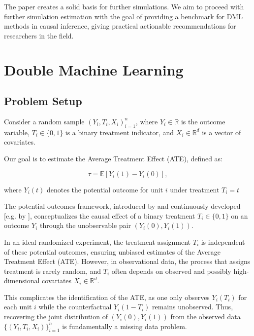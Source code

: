 \documentclass{article}
\numberwithin{equation}{section}
\begin{document}
The paper creates a solid basis for further simulations. We aim to proceed with further simulation estimation with the goal of providing a benchmark for DML methods in causal inference, giving practical actionable recommendations for researchers in the field.

\newpage
\tableofcontents
\newpage

\section{Double Machine Learning}

\subsection{Problem Setup}

Consider a random sample ${(Y_i, T_i, X_i)}_{i=1}^n$, where $Y_i \in \mathbb{R}$ is the outcome variable, $T_i \in \{0,1\}$ is a binary treatment indicator, and $X_i \in \mathbb{R}^d$ is a vector of covariates.

Our goal is to estimate the Average Treatment Effect (ATE), defined as:

\begin{equation}
\tau = \mathbb{E}[Y_i(1) - Y_i(0)],
\label{eq:tau_hat_potential_outcome}
\end{equation}

where $Y_i(t)$ denotes the potential outcome for unit $i$ under treatment $T_i = t$

The potential outcomes framework, introduced by \cite{Rubin1974} and continuously developed [e.g. by \cite{ImbensRubin2015}], conceptualizes the causal effect of a binary treatment \(T_i \in \{0,1\}\) on an outcome \(Y_i\) through the unobservable pair \((Y_i(0), Y_i(1))\).

In an ideal randomized experiment, the treatment assignment \(T_i\) is independent of these potential outcomes, ensuring unbiased estimates of the Average Treatment Effect (ATE). However, in observational data, the process that assigns treatment is rarely random, and \(T_i\) often depends on observed and possibly high-dimensional covariates \(X_i \in \mathbb{R}^d\).

This complicates the identification of the ATE, as one only observes \(Y_i(T_i)\) for each unit \(i\) while the counterfactual \(Y_i(1-T_i)\) remains unobserved. Thus, recovering the joint distribution of \((Y_i(0), Y_i(1))\) from the observed data \(\{(Y_i, T_i, X_i)\}_{i=1}^n\) is fundamentally a missing data problem.
\end{document}
